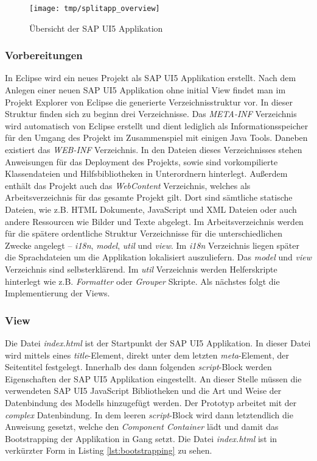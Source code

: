 \vspace{1em}
\begin{figure}[htb]
  \centering
  \texttt{[image: tmp/splitapp\_overview]}
  \caption[Übersicht der SAP UI5 Applikation]{Übersicht der SAP UI5 Applikation \cite{SAPSplitApp}}
  \label{fig:splitappoverview}
\end{figure}

\subsubsection{Vorbereitungen}
In Eclipse wird ein neues Projekt als SAP UI5 Applikation erstellt. Nach dem Anlegen einer neuen SAP UI5 Applikation ohne initial View findet man im Projekt Explorer von Eclipse die generierte Verzeichnisstruktur vor. In dieser Struktur finden sich zu beginn drei Verzeichnisse. Das \textit{META-INF} Verzeichnis wird automatisch von Eclipse erstellt und dient lediglich als Informationsspeicher für den Umgang des Projekt im Zusammenspiel mit einigen Java Tools. Daneben existiert das \textit{WEB-INF} Verzeichnis. In den Dateien dieses Verzeichnisses stehen Anweisungen für das Deployment des Projekts, sowie sind vorkompilierte Klassendateien und Hilfsbibliotheken in Unterordnern hinterlegt. Außerdem enthält das Projekt auch das \textit{WebContent} Verzeichnis, welches als Arbeitsverzeichnis für das gesamte Projekt gilt. Dort sind sämtliche statische Dateien, wie z.B. HTML Dokumente, JavaScript und XML Dateien oder auch andere Ressourcen wie Bilder und Texte abgelegt. Im Arbeitsverzeichnis werden für die spätere ordentliche Struktur Verzeichnisse für die unterschiedlichen Zwecke angelegt -- \textit{i18n}, \textit{model}, \textit{util} und \textit{view}. Im \textit{i18n} Verzeichnis liegen später die Sprachdateien um die Applikation lokalisiert auszuliefern. Das \textit{model} und \textit{view} Verzeichnis sind selbsterklärend. Im \textit{util} Verzeichnis werden Helferskripte hinterlegt wie z.B. \textit{Formatter} oder \textit{Grouper} Skripte. Als nächstes folgt die Implementierung der Views.

\subsubsection{View}
Die Datei \textit{index.html} ist der Startpunkt der SAP UI5 Applikation. In dieser Datei wird mittels eines \textit{title}-Element, direkt unter dem letzten \textit{meta}-Element, der Seitentitel festgelegt. Innerhalb des dann folgenden \textit{script}-Block werden Eigenschaften der SAP UI5 Applikation eingestellt. An dieser Stelle müssen die verwendeten SAP UI5 JavaScript Bibliotheken und die Art und Weise der Datenbindung des Modells hinzugefügt werden. Der Prototyp arbeitet mit der \textit{complex} Datenbindung. In dem leeren \textit{script}-Block wird dann letztendlich die Anweisung gesetzt, welche den \textit{Component Container} lädt und damit das Bootstrapping der Applikation in Gang setzt. Die Datei \textit{index.html} ist in verkürzter Form in Listing \ref{lst:bootstrapping} zu sehen.
	
